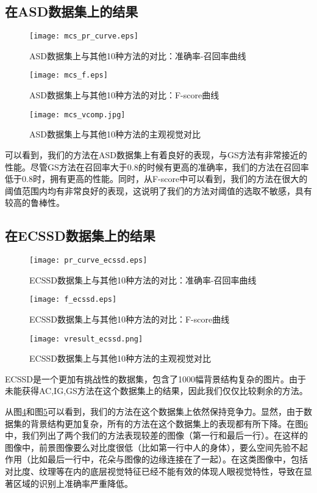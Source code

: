 \subsection{在ASD数据集上的结果}
\begin{figure}
\centering
\texttt{[image: mcs\_pr\_curve.eps]}
\caption{ASD数据集上与其他10种方法的对比：准确率-召回率曲线}
\label{fig:results2_pr}
\end{figure}
\begin{figure}
\centering
\texttt{[image: mcs\_f.eps]}
\caption{ASD数据集上与其他10种方法的对比：F-score曲线}
\label{fig:results2_fscore}
\end{figure}
\begin{figure}
\centering
\texttt{[image: mcs\_vcomp.jpg]}
\caption{ASD数据集上与其他10种方法的主观视觉对比}\label{fig:vresult2}
\end{figure}

可以看到，我们的方法在ASD数据集上有着良好的表现，与GS方法有非常接近的性能。尽管GS方法在召回率大于0.8的时候有更高的准确率，我们的方法在召回率低于0.8时，拥有更高的性能。同时，从F-score中可以看到，我们的方法在很大的阈值范围内均有非常良好的表现，这说明了我们的方法对阈值的选取不敏感，具有较高的鲁棒性。

\subsection{在ECSSD数据集上的结果}
\begin{figure}
\centering
\texttt{[image: pr\_curve\_ecssd.eps]}
\caption{ECSSD数据集上与其他10种方法的对比：准确率-召回率曲线}
\label{fig:results2_pr_ecssd}
\end{figure}
\begin{figure}
\centering
\texttt{[image: f\_ecssd.eps]}
\caption{ECSSD数据集上与其他10种方法的对比：F-score曲线}
\label{fig:results2_fscore_ecssd}
\end{figure}
\begin{figure}
\centering
\texttt{[image: vresult\_ecssd.png]}
\caption{ECSSD数据集上与其他10种方法的主观视觉对比}\label{fig:vresult2_ecssd}
\end{figure}

ECSSD是一个更加有挑战性的数据集，包含了1000幅背景结构复杂的图片。由于未能获得AC,IG,GS方法在这个数据集上的结果，因此我们仅仅比较剩余的方法。

从图\ref{fig:results2_pr_ecssd}和图\ref{fig:results2_fscore_ecssd}可以看到，我们的方法在这个数据集上依然保持竞争力。显然，由于数据集的背景结构更加复杂，所有的方法在这个数据集上的表现都有所下降。在图\ref{fig:vresult2_ecssd}中，我们列出了两个我们的方法表现较差的图像（第一行和最后一行）。在这样的图像中，前景图像要么对比度很低（比如第一行中人的身体），要么空间先验不起作用（比如最后一行中，花朵与图像的边缘连接在了一起）。在这类图像中，包括对比度、纹理等在内的底层视觉特征已经不能有效的体现人眼视觉特性，导致在显著区域的识别上准确率严重降低。

